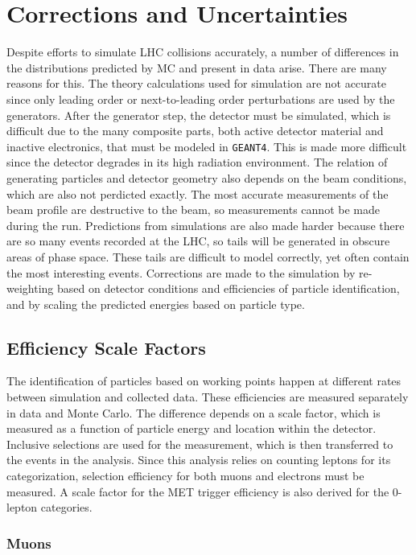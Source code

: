 \chapter{Corrections and Uncertainties}

Despite efforts to simulate LHC collisions accurately,
a number of differences in the distributions predicted by MC and present in data arise.
There are many reasons for this.
The theory calculations used for simulation are not accurate since only leading order or
next-to-leading order perturbations are used by the generators.
After the generator step, the detector must be simulated,
which is difficult due to the many composite parts,
both active detector material and inactive electronics, that must be modeled in \texttt{GEANT4}.
This is made more difficult since the detector degrades in its high radiation environment.
The relation of generating particles and detector geometry also depends on the beam conditions,
which are also not perdicted exactly.
The most accurate measurements of the beam profile are destructive to the beam,
so measurements cannot be made during the run.
Predictions from simulations are also made harder because there are so many events recorded at the LHC,
so tails will be generated in obscure areas of phase space.
These tails are difficult to model correctly, yet often contain the most interesting events.
Corrections are made to the simulation by re-weighting based on detector conditions and
efficiencies of particle identification,
and by scaling the predicted energies based on particle type.

\section{Efficiency Scale Factors}

The identification of particles based on working points happen at different rates
between simulation and collected data.
These efficiencies are measured separately in data and Monte Carlo.
The difference depends on a scale factor,
which is measured as a function of particle energy and location within the detector.
Inclusive selections are used for the measurement,
which is then transferred to the events in the analysis.
Since this analysis relies on counting leptons for its categorization,
selection efficiency for both muons and electrons must be measured.
A scale factor for the MET trigger efficiency is also derived for the 0-lepton categories.

\subsection{Muons}

